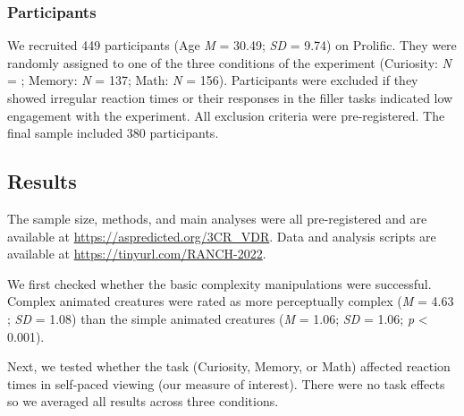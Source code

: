 \documentclass[10pt, letterpaper]{article}
\begin{document}
\hypertarget{participants}{%
\subsubsection{Participants}\label{participants}}

We recruited 449 participants (Age \emph{M} = 30.49; \emph{SD} = 9.74)
on Prolific. They were randomly assigned to one of the three conditions
of the experiment (Curiosity: \emph{N} = ; Memory: \emph{N} = 137; Math:
\emph{N} = 156). Participants were excluded if they showed irregular
reaction times or their responses in the filler tasks indicated low
engagement with the experiment. All exclusion criteria were
pre-registered. The final sample included 380 participants.

\hypertarget{results}{%
\subsection{Results}\label{results}}

The sample size, methods, and main analyses were all pre-registered and
are available at \url{https://aspredicted.org/3CR_VDR}. Data and
analysis scripts are available at \url{https://tinyurl.com/RANCH-2022}.

We first checked whether the basic complexity manipulations were
successful. Complex animated creatures were rated as more perceptually
complex (\emph{M} = 4.63 ; \emph{SD} = 1.08) than the simple animated
creatures (\emph{M} = 1.06; \emph{SD} = 1.06; \emph{p} \textless{}
0.001).

Next, we tested whether the task (Curiosity, Memory, or Math) affected
reaction times in self-paced viewing (our measure of interest). There
were no task effects so we averaged all results across three conditions.
\end{document}
